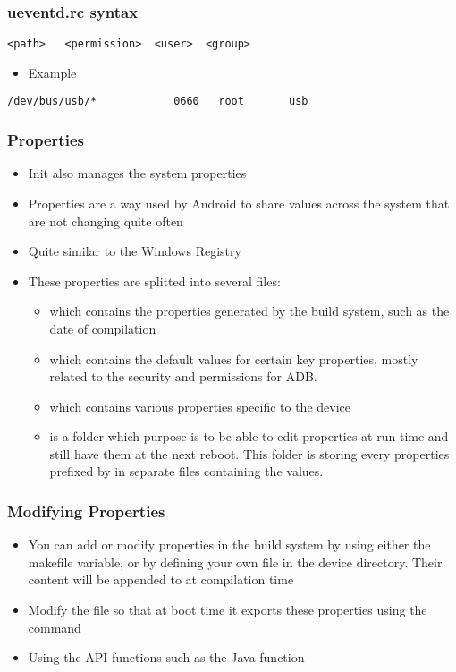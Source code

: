 \begin{frame}[fragile]
  \frametitle{ueventd.rc syntax}
\begin{verbatim}
<path>   <permission>  <user>  <group>
\end{verbatim}
  \begin{itemize}
  \item Example
  \end{itemize}
\begin{verbatim}
/dev/bus/usb/*            0660   root       usb
\end{verbatim}
\end{frame}

\begin{frame}
  \frametitle{Properties}
  \begin{itemize}
  \item Init also manages the system properties
  \item Properties are a way used by Android to share values across
    the system that are not changing quite often
  \item Quite similar to the Windows Registry
  \item These properties are splitted into several files:
    \begin{itemize}
    \item {} which contains the properties
      generated by the build system, such as the date of compilation
    \item {} which contains the default values for
      certain key properties, mostly related to the security and
      permissions for ADB.
    \item {} which contains various properties
      specific to the device
    \item {} is a folder which purpose is to be
      able to edit properties at run-time and still have them at the
      next reboot. This folder is storing every properties prefixed by
       in separate files containing the values.
    \end{itemize}
  \end{itemize}
\end{frame}

\begin{frame}
  \frametitle{Modifying Properties}
  \begin{itemize}
  \item You can add or modify properties in the build system by using
    either the  makefile variable, or
    by defining your own  file in the device
    directory. Their content will be appended to
     at compilation time
  \item Modify the  file so that at boot time it exports
    these properties using the  command
  \item Using the API functions such as the Java function
  \end{itemize}
\end{frame}


